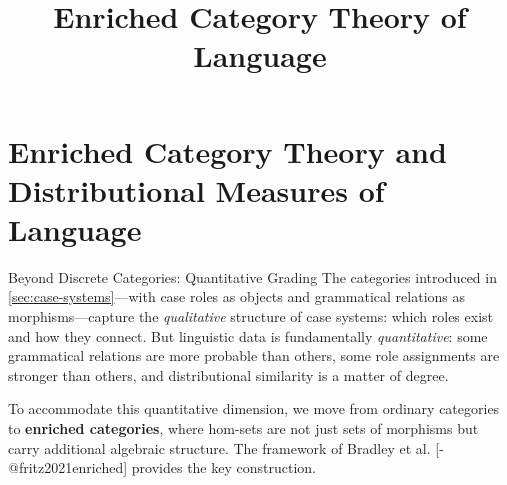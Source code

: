 \documentclass[
  ignorenonframetext,
]{beamer}
\title{\texorpdfstring{Enriched Category Theory of
Language}{Enriched Category Theory of Language}}
\author{\texorpdfstring{}{}}
\date{}
\begin{document}
\frame{\titlepage}

\section{Enriched Category Theory and Distributional Measures of
Language}\label{sec:enriched-categories}

\begin{frame}{Beyond Discrete Categories: Quantitative Grading}
\protect{}\label{beyond-discrete-categories-quantitative-grading}
The categories introduced in \autoref{sec:case-systems}---with case
roles as objects and grammatical relations as morphisms---capture the
\emph{qualitative} structure of case systems: which roles exist and how
they connect. But linguistic data is fundamentally \emph{quantitative}:
some grammatical relations are more probable than others, some role
assignments are stronger than others, and distributional similarity is a
matter of degree.

To accommodate this quantitative dimension, we move from ordinary
categories to \textbf{enriched categories}, where hom-sets are not just
sets of morphisms but carry additional algebraic structure. The
framework of Bradley et al. {[}-@fritz2021enriched{]} provides the key
construction.
\end{frame}
\end{document}
